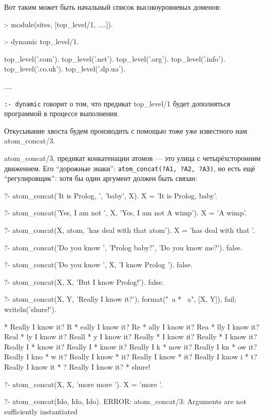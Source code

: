 \documentclass[a4paper]{book}
\begin{document}
Вот таким может быть начальный список высокоуровневых доменов:

\begin{example}{}{}
:- module(sites, [top_level/1, ....]).

:- dynamic top_level/1.

top_level('.com').
top_level('.net').
top_level('.org').
top_level('.info').
top_level('.co.uk').
top_level('.dp.ua').

....
\end{example}

\verb|:- dynamic| говорит о том, что предикат top_level/1
будет дополняться программой в процессе выполнения.

Откусывание хвоста будем производить с помощью тоже уже
известного нам atom_concat/3.

atom_concat/3, предикат конкатенации атомов --- это улица с
четырёхсторонним движением. Его ``дорожные знаки'':
\verb|atom_concat(?A1, ?A2, ?A3)|, но есть ещё ``регулировщик'':
хотя бы один аргумент должен быть связан:

\begin{bigexample}{}{}
?- atom_concat('It is Prolog, ', 'baby', X).
X = 'It is Prolog, baby'.

?- atom_concat('Yes, I am not ', X, 'Yes, I am not A wimp').
X = 'A wimp'.

?- atom_concat(X, atom, 'has deal with that atom').
X = 'has deal with that '.

?- atom_concat('Do you know ', 'Prolog baby?', 'Do you know me?').
false.
 
?- atom_concat('Do you know ', X, 'I know Prolog ').
false.

?- atom_concat(X, X, 'But I know Prolog!').
false. %

?- atom_concat(X, Y, 'Really I know it?'), 
   format("~a * ~a\n", [X, Y]),                                             
   fail; writeln('shure!').                                                

 * Really I know it?
R * eally I know it?
Re * ally I know it?
Rea * lly I know it?
Real * ly I know it?
Reall * y I know it?
Really *  I know it?
Really  * I know it?
Really I *  know it?
Really I  * know it?
Really I k * now it?
Really I kn * ow it?
Really I kno * w it?
Really I know *  it?
Really I know  * it?
Really I know i * t?
Really I know it * ?
Really I know it? * 
shure!

?- atom_concat(X, X, 'more more ').
X = 'more '. 

?- atom_concat(Ido, Ido, Ido).
ERROR: atom_concat/3: Arguments are not sufficiently instantiated
\end{bigexample}
\end{document}
